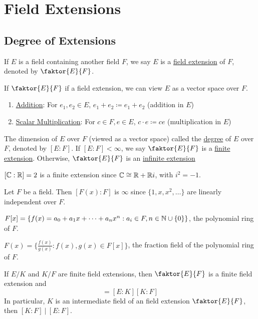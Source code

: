\documentclass[11pt]{article}
\newcommand{\quotient}[2]{\faktor{#1}{#2}}
\begin{document}
\pagebreak
\section{Field Extensions}
\subsection{Degree of Extensions}
\begin{definition}
If $E$ is a field containing another field $F$, we say $E$ is a
\underline{field extension} of $F$, denoted by $\quotient EF$.
\end{definition}
If $\quotient{E}{F}$ if a field extension, we can view $E$ as a vector space over $F$.
\begin{enumerate}
\item \underline{Addition}: For $e_1, e_2 \in E$, $e_1 + e_2 \coloneqq e_1 +
e_2$ (addition in $E$)
\item \underline{Scalar Multiplication}: For $c \in F, e \in E$, $c \cdot e
\coloneqq ce$ (multiplication in $E$)
\end{enumerate}
\begin{definition}
The dimension of $E$ over $F$ (viewed as a vector space) called the
\underline{degree} of $E$ over $F$, denoted by $[E:F]$. If $[E:F] < \infty$, we
say $\quotient EF$ is a \underline{finite extension}. Otherwise, $\quotient{E}{F}$ is an
\underline{infinite extension}
\end{definition}
\begin{example}
$[\mathbb{C} : \mathbb{R}] = 2$ is a  finite extension since $\mathbb{C} \cong \mathbb{R} + \mathbb{R} i$, with $i^2 =
-1$.
\end{example}
\begin{example}
Let $F$ be a field. Then $[F(x) : F]$ is $\infty$ since $\{1, x, x^2, \dots\}$ are
linearly independent over $F$.
\end{example}
\begin{remark}
$F[x] = \{f(x) = a_0 + a_1x + \dots + a_nx^n : a_i \in F, n \in \mathbb{N} \cup
\{0\}\}$, the polynomial ring of $F$.
\end{remark}
\begin{remark}
$F(x) = \{\frac{f(x)}{g(x)} : f(x), g(x) \in F[x]\}$, the fraction
field of the polynomial ring of $F$. 
\end{remark}
\begin{theorem} \label{theorem1}
If $E/K$ and $K/F$ are finite field extensions, then $\quotient{E}{F}$ is a finite field
extension and
\begin{equation*}
[E:F] = [E:K][K:F]
\end{equation*}
In particular, $K$ is an intermediate field of an field extension $\quotient{E}{F}$, then
$[K:F]\>\big|\> [E:F]$. 
\end{theorem}
\end{document}

